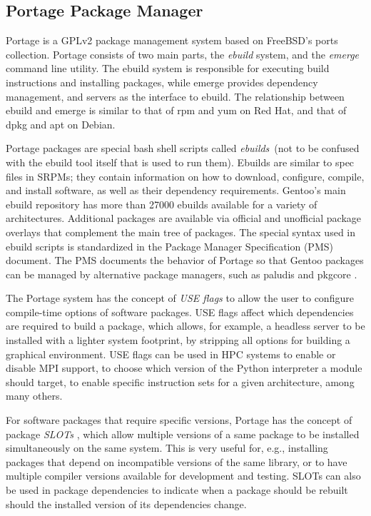 \documentclass[a4paper,conference]{IEEEtran}
\begin{document}
\subsection{Portage Package Manager}
\label{sec:ebuild}

Portage is a GPLv2 package management system based on FreeBSD's ports
collection. Portage consists of two main parts, the \emph{ebuild}
system, and the \emph{emerge} command line utility. The ebuild system is
responsible for executing build instructions and installing packages,
while emerge provides dependency management, and servers as the
interface to ebuild. The relationship between ebuild and emerge is
similar to that of rpm and yum on Red Hat, and that of dpkg and apt on
Debian.

Portage packages are special bash shell scripts called
\emph{ebuilds}~(not to be confused with the ebuild tool itself that is
used to run them). Ebuilds are similar to spec files in SRPMs; they
contain information on how to download, configure, compile, and
install software, as well as their dependency requirements. Gentoo's
main ebuild repository has more than 27000 ebuilds available for a
variety of architectures. Additional packages are available via
official and unofficial package overlays that complement the main tree
of packages.  The special syntax used in ebuild scripts is
standardized in the Package Manager Specification (PMS)
\cite{gentoo:pms} document. The PMS documents the behavior of Portage
so that Gentoo packages can be managed by alternative package
managers, such as paludis \cite{paludis} and pkgcore \cite{pkgcore}.

The Portage system has the concept of \emph{USE flags} to allow the
user to configure compile-time options of software packages. USE flags
affect which dependencies are required to build a package, which
allows, for example, a headless server to be installed with a lighter
system footprint, by stripping all options for building a graphical
environment. USE flags can be used in HPC systems to enable or disable
MPI support, to choose which version of the Python interpreter a
module should target, to enable specific instruction sets for a given
architecture, among many others.

For software packages that require specific versions, Portage has the
concept of package \emph{SLOTs} \cite[p.~27]{gentoo:pms}, which allow multiple versions of a same
package to be installed simultaneously on the same system. This is very
useful for, e.g., installing packages that depend on incompatible
versions of the same library, or to have multiple compiler versions
available for development and testing. SLOTs can also be used in package
dependencies to indicate when a package should be rebuilt should the
installed version of its dependencies change.
\end{document}
